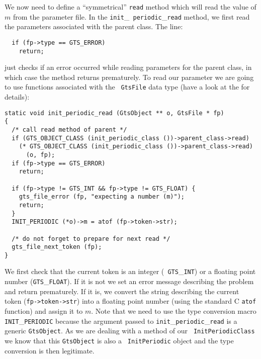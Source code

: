 \documentclass[a4paper]{article}
\begin{document}
We now need to define a ``symmetrical'' {\tt read} method which will
read the value of $m$ from the parameter file. In the {\tt init}\_{\tt
periodic}\_{\tt read} method, we first read the parameters associated
with the parent class. The line:
\begin{verbatim}
  if (fp->type == GTS_ERROR)
    return;
\end{verbatim}
just checks if an error occurred while reading parameters for the
parent class, in which case the method returns prematurely. To read
our parameter we are going to use functions associated with the {\tt
GtsFile} data type (have a look at the  for
details):
\begin{verbatim}
static void init_periodic_read (GtsObject ** o, GtsFile * fp)
{
  /* call read method of parent */
  if (GTS_OBJECT_CLASS (init_periodic_class ())->parent_class->read)
    (* GTS_OBJECT_CLASS (init_periodic_class ())->parent_class->read) 
      (o, fp);
  if (fp->type == GTS_ERROR)
    return;

  if (fp->type != GTS_INT && fp->type != GTS_FLOAT) {
    gts_file_error (fp, "expecting a number (m)");
    return;
  }
  INIT_PERIODIC (*o)->m = atof (fp->token->str);

  /* do not forget to prepare for next read */
  gts_file_next_token (fp);
}
\end{verbatim}
We first check that the current token is an integer ({\tt
GTS}\_{\tt INT}) or a floating point number ({\tt GTS}\_{\tt FLOAT}). If it is not
we set an error message describing the problem and return
prematurely. If it is, we convert the string describing the current
token ({\tt fp->token->str}) into a floating point number (using the
standard C {\tt atof} function) and assign it to $m$. Note that we
need to use the type conversion macro {\tt INIT}\_{\tt PERIODIC}
because the argument passed to {\tt init}\_{\tt periodic}\_{\tt read} is a generic
{\tt GtsObject}. As we are dealing with a method of our {\tt
InitPeriodicClass} we know that this {\tt GtsObject} is also a {\tt
InitPeriodic} object and the type conversion is then legitimate.
\end{document}

